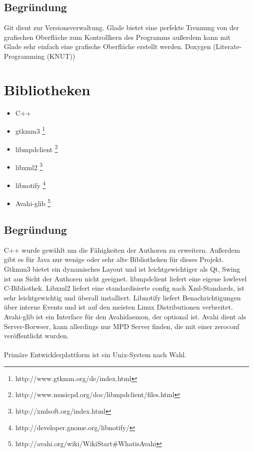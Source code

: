 \subsection{Begründung}
Git dient zur Versionsverwaltung. Glade bietet eine perfekte Trennung von der grafischen 
Oberfläche zum Kontrollkern des Programms außerdem kann mit Glade sehr
einfach eine grafische Oberfläche erstellt werden. Doxygen (Literate-Programming (KNUT))
\section{Bibliotheken}
\begin{itemize}
\item C++
\item gtkmm3 \footnote{http://www.gtkmm.org/de/index.html}
\item libmpdclient \footnote{http://www.musicpd.org/doc/libmpdclient/files.html}
\item libxml2 \footnote{http://xmlsoft.org/index.html}
\item libnotify \footnote{http://developer.gnome.org/libnotify/}
\item Avahi-glib \footnote{http://avahi.org/wiki/WikiStart#WhatisAvahi}
\end{itemize}
\subsection{Begründung}
C++ wurde gewählt um die Fähigkeiten der Authoren zu erweitern. Außerdem gibt es für Java nur wenige
oder sehr alte Bibliotheken für dieses Projekt. Gtkmm3 bietet ein dynamisches Layout und ist
leichtgewichtiger als Qt, Swing ist aus Sicht der Authoren nicht geeignet. libmpdclient liefert eine 
eigene lowlevel C-Bibliothek.
Libxml2 liefert eine standardisierte config nach Xml-Standards, ist sehr leichtgewichtig und überall
installiert. Libnotify liefert Benachrichtigungen über interne Events und ist auf den meisten Linux
Distributionen verbreitet. Avahi-glib ist ein Interface für den Avahidaemon, der optional ist. Avahi 
dient als Server-Borwser, kann allerdings nur MPD Server finden, die mit einer zeroconf veröffentlicht 
wurden.\ \\ \\
Primäre Entwicklerplattform ist ein Unix-System nach Wahl.
